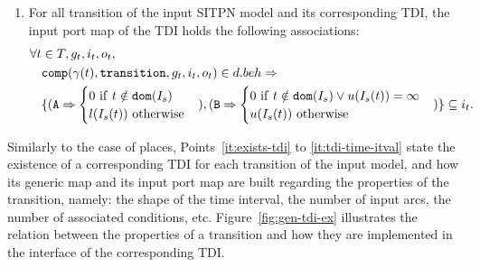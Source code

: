 \begin{definition}
\begin{enumerate}[resume]
  \item\label{it:tdi-time-itval} For all transition of the input SITPN
    model and its corresponding TDI, the input port map of the TDI
    holds the following associations:
    \begin{equation*}
      \begin{aligned}[t]
        \forall{}t&\in{}T,g_t,i_t,o_t, \\
                  & \mathtt{comp}(\gamma(t),\mathtt{transition},g_t,i_t,o_t)\in{}d.beh\Rightarrow \\
                  & \{(\mathtt{A}\Rightarrow\begin{cases}
                                              0~\mathrm{if}~t\notin\mathtt{dom}(I_s) \\
                                              l(I_s(t))~\mathrm{otherwise} \\
                                            \end{cases}),
        (\mathtt{B}\Rightarrow\begin{cases}
                                0~\mathrm{if}~t\notin\mathtt{dom}(I_s)\lor{}u(I_s(t))=\infty \\
                                u(I_s(t))~\mathrm{otherwise} \\
                              \end{cases})\}\subseteq{}i_t. \\
      \end{aligned}
    \end{equation*}

  \end{enumerate}

  \bigskip

  Similarly to the case of places, Points~\ref{it:exists-tdi} to
  \ref{it:tdi-time-itval} state the existence of a corresponding TDI
  for each transition of the input model, and how its generic map and
  its input port map are built regarding the properties of the
  transition, namely: the shape of the time interval, the number of
  input arcs, the number of associated conditions,
  etc. Figure~\ref{fig:gen-tdi-ex} illustrates the relation between
  the properties of a transition and how they are implemented in the
  interface of the corresponding TDI.


\end{definition}
